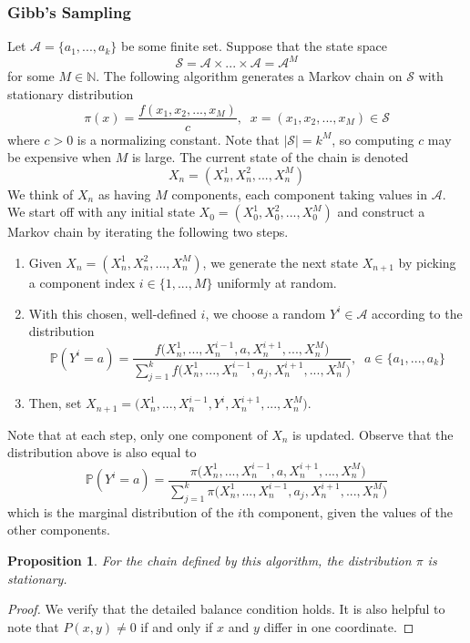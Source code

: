 \documentclass{article}
\newtheorem{proposition}[theorem]{Proposition}
\theoremstyle{remark}
\theoremstyle{definition}
\begin{document}
\subsubsection{Gibb's Sampling}
Let $\mathcal{A} = \{a_1, ..., a_k\}$ be some finite set. Suppose that the state space 
\[\mathcal{S} = \mathcal{A} \times ... \times \mathcal{A} = \mathcal{A}^M\]
for some $M \in \mathbb{N}$. The following algorithm generates a Markov chain on $\mathcal{S}$ with stationary distribution
\[\pi(x) = \frac{f(x_1, x_2, ..., x_M)}{c}, \;\; x = (x_1, x_2, ..., x_M) \in \mathcal{S} \]
where $c >0$ is a normalizing constant. Note that $|\mathcal{S}| = k^M$, so computing $c$ may be expensive when $M$ is large. The current state of the chain is denoted 
\[X_n = (X_n^1, X_n^2, ..., X_n^M)\]
We think of $X_n$ as having $M$ components, each component taking values in $\mathcal{A}$. We start off with any initial state $X_0 = (X_0^1, X_0^2, ..., X_0^M)$ and construct a Markov chain by iterating the following two steps. 
\begin{enumerate}
    \item Given $X_n = (X_n^1, X_n^2, ..., X_n^M)$, we generate the next state $X_{n+1}$ by picking a component index $i \in \{1, ..., M\}$ uniformly at random. 
    \item With this chosen, well-defined $i$, we choose a random $Y^i \in \mathcal{A}$ according to the distribution
    \[\mathbb{P}(Y^i = a) = \frac{f\big(X_n^1 ,..., X_n^{i-1}, a, X_n^{i+1}, ..., X_n^M\big)}{\sum_{j=1}^k f\big(X_n^1 ,..., X_n^{i-1}, a_j, X_n^{i+1}, ..., X_n^M\big)}, \;\; a \in \{a_1, ..., a_k\}\]
    \item Then, set $X_{n+1} = \big(X_n^1, ..., X_n^{i-1}, Y^i, X_n^{i+1}, ..., X_n^M\big)$. 
\end{enumerate}
Note that at each step, only one component of $X_n$ is updated. Observe that the distribution above is also equal to 
\[\mathbb{P}(Y^i = a) = \frac{\pi\big(X_n^1 ,..., X_n^{i-1}, a, X_n^{i+1}, ..., X_n^M\big)}{\sum_{j=1}^k \pi \big(X_n^1 ,..., X_n^{i-1}, a_j, X_n^{i+1}, ..., X_n^M\big)}\]
which is the marginal distribution of the $i$th component, given the values of the other components. 

\begin{proposition}
For the chain defined by this algorithm, the distribution $\pi$ is stationary. 
\end{proposition}
\begin{proof}
We verify that the detailed balance condition holds. It is also helpful to note that $P(x, y) \neq 0$ if and only if $x$ and $y$ differ in one coordinate. 
\end{proof}
\end{document}
